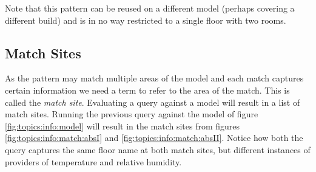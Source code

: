Note that this pattern can be reused on a different model (perhaps covering a different build) and is in no way restricted to a single floor with two rooms.

\subsection{Match Sites}

As the pattern may match multiple areas of the model and each match captures certain information we need a term to refer to the area of the match. This is called the \textsl{match site}. Evaluating a query against a model will result in a list of match sites. Running the previous query against the model of figure \ref{fig:topics:info:model} will result in the match sites from figures \ref{fig:topics:info:match:absI} and \ref{fig:topics:info:match:absII}. Notice how both the query captures the same floor name at both match sites, but different instances of providers of temperature and relative humidity.

